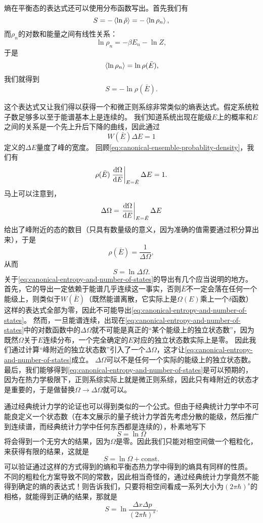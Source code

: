 \documentclass[hyperref, UTF8, a4paper]{ctexart}
\newcommand*{\const}{\mathrm{const}}
\renewcommand{\autoref}{\prettyref}
\begin{document}
熵在平衡态的表达式还可以使用分布函数写出。首先我们有
\[
    S = - \expval*{\ln \hat{\rho}} = - \expval*{\ln \rho_n},
\]
而$\rho_n$的对数和能量之间有线性关系：
\[
    \ln \rho_n = - \beta E_n - \ln Z,
\]
于是
\[
    \expval*{\ln \rho_n} = \ln \rho(\bar{E}),
\]
我们就得到
\begin{equation}
    S = - \ln \rho(\bar{E}).
\end{equation}

这个表达式又让我们得以获得一个和微正则系综非常类似的熵表达式。假定系统粒子数足够多以至于能谱基本上是连续的。
我们知道系统出现在能级$E$上的概率和$E$之间的关系是一个先上升后下降的曲线，因此通过
\begin{equation}
    W(\bar{E}) \Delta E = 1
\end{equation}
定义的$\Delta E$量度了峰的宽度。
回顾\eqref{eq:canonical-ensemble-probablity-density}，我们有
\[
    \rho(\bar{E}) \eval{\dv{\Omega}{E}}_{E=\bar{E}} \Delta E = 1.
\]
马上可以注意到，
\begin{equation}
    \Delta \Omega = \eval{\dv{\Omega}{E}}_{E=\bar{E}} \Delta E
\end{equation}
给出了峰附近的态的数目（只具有数量级的意义，因为准确的值需要通过积分算出来），于是
\[
    \rho(\bar{E}) = \frac{1}{\Delta \Omega},
\]
从而
\begin{equation}
    S = \ln \Delta \Omega.
    \label{eq:canonical-entropy-and-number-of-states}
\end{equation}
关于\eqref{eq:canonical-entropy-and-number-of-states}的导出有几个应当说明的地方。首先，它的导出一定依赖于能谱几乎连续这一事实，否则$\bar{E}$不一定会落在任何一个能级上，则类似于$W(\bar{E})$（既然能谱离散，它实际上是$\Omega(E)$乘上一个$\delta$函数）这样的表达式全部为零，因此不可能导出\eqref{eq:canonical-entropy-and-number-of-states}。
然而，一旦能谱连续，出现在\eqref{eq:canonical-entropy-and-number-of-states}中的对数函数中的$\Delta\Omega$就不可能是真正的“某个能级上的独立状态数”，因为既然$\Omega$关于$E$连续分布，一个完全确定的$E$对应的独立状态数实际上是零。
因此我们通过计算“峰附近的独立状态数”引入了一个$\Delta\Omega$，这才让\eqref{eq:canonical-entropy-and-number-of-states}成立。
$\Delta\Omega$可以不是任何一个实际的能级上的独立状态数。
最后，我们能够得到\eqref{eq:canonical-entropy-and-number-of-states}是可以预期的，因为在热力学极限下，正则系综实际上就是微正则系综，因此只有峰附近的状态才是重要的，于是做替换$\Omega\longrightarrow \Delta\Omega$就可以。

通过经典统计力学的论证也可以得到类似的一个公式。但由于经典统计力学中不可能良定义一个状态数（在本文展示的量子统计力学首先考虑分散的能级，然后推广到连续谱，而经典统计力学中任何东西都是连续的），朴素地写下
\[
    S = \ln \Omega
\]
将会得到一个无穷大的结果，因为$\Omega$是零。因此我们只能对相空间做一个粗粒化，来获得有限的结果，这就是
\[
    S = \ln \Omega + \const.
\]
可以验证通过这样的方式得到的熵和平衡态热力学中得到的熵具有同样的性质。
不同的粗粒化方案导致不同的常数，因此相当奇怪的，通过经典统计力学竟然不能得到确定的熵的表达式！\autoref{sec:back-to-classical}则告诉我们，只要将相空间看成一系列大小为$(2\pi \hbar)^s$的相格，就能得到正确的结果，那就是
\begin{equation}
    S = \ln \frac{\Delta x \Delta p}{(2\pi\hbar)^s}.
\end{equation}
\end{document}
